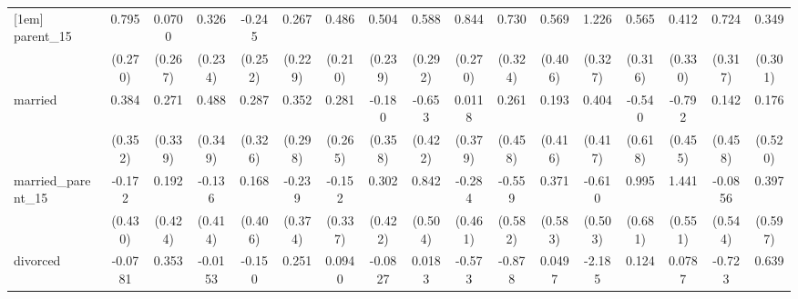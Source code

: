 {\begin{tabular}{l*{16}{c}}
[1em]
parent\_15           &       0.795\sym{**} &      0.0700         &       0.326         &      -0.245         &       0.267         &       0.486\sym{*}  &       0.504\sym{*}  &       0.588\sym{*}  &       0.844\sym{**} &       0.730\sym{*}  &       0.569         &       1.226\sym{***}&       0.565         &       0.412         &       0.724\sym{*}  &       0.349         \\
                    &     (0.270)         &     (0.267)         &     (0.234)         &     (0.252)         &     (0.229)         &     (0.210)         &     (0.239)         &     (0.292)         &     (0.270)         &     (0.324)         &     (0.406)         &     (0.327)         &     (0.316)         &     (0.330)         &     (0.317)         &     (0.301)         \\
[1em]
married             &       0.384         &       0.271         &       0.488         &       0.287         &       0.352         &       0.281         &      -0.180         &      -0.653         &      0.0118         &       0.261         &       0.193         &       0.404         &      -0.540         &      -0.792         &       0.142         &       0.176         \\
                    &     (0.352)         &     (0.339)         &     (0.349)         &     (0.326)         &     (0.298)         &     (0.265)         &     (0.358)         &     (0.422)         &     (0.379)         &     (0.458)         &     (0.416)         &     (0.417)         &     (0.618)         &     (0.455)         &     (0.458)         &     (0.520)         \\
[1em]
married\_parent\_15   &      -0.172         &       0.192         &      -0.136         &       0.168         &      -0.239         &      -0.152         &       0.302         &       0.842         &      -0.284         &      -0.559         &       0.371         &      -0.610         &       0.995         &       1.441\sym{**} &     -0.0856         &       0.397         \\
                    &     (0.430)         &     (0.424)         &     (0.414)         &     (0.406)         &     (0.374)         &     (0.337)         &     (0.422)         &     (0.504)         &     (0.461)         &     (0.582)         &     (0.583)         &     (0.503)         &     (0.681)         &     (0.551)         &     (0.544)         &     (0.597)         \\
[1em]
divorced            &     -0.0781         &       0.353         &     -0.0153         &      -0.150         &       0.251         &      0.0940         &     -0.0827         &      0.0183         &      -0.573         &      -0.878         &      0.0497         &      -2.185\sym{*}  &       0.124         &      0.0787         &      -0.723         &       0.639         \\

\end{tabular}}
